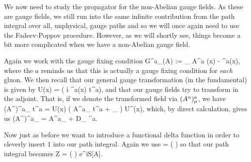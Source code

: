 We now need to study the propagator for the non-Abelian gauge fields. As these are gauge fields, we still run into the same infinite contribution from the path integral over all, unphysical, gauge paths and so we will once again need to use the Fadeev-Poppov procedure. However, as we will shortly see, things become a bit more complicated when we have a non-Abelian gauge field. 

Again we work with the gauge fixing condition 
\bse 
	G^a_{\omega}(A) := \p_{\mu} A^{a \mu}(x) - \omega^a(x),
\ese 
where the $a$ reminds us that this is actually a gauge fixing condition for \textit{each} gluon. We then recall that our general gauge transformation (in the fundamental) is given by 
\bse 
	U(x) = \exp\big( i \a^a(x) t^a\big),
\ese
and that our gauge fields try to transform in the adjoint. That is, if we denote the transformed field via $ (A^{\alpha})^a_{\mu} $, we have 
\bse 
	(A^{\a})^a_{\mu} t^a = U(x) \bigg( A^a_{\mu} t^a +  \p_{\mu} \bigg) U^{\dagger}(x),
\ese 
which, by direct calculation, gives us 
\bse 
	(A^{\a})^a_{\mu} = A^a_{\mu} + D_{\mu} \a^a.
\ese 

Now just as before we want to introduce a functional delta function in order to cleverly insert $1$ into our path integral. Again we use 
 = \int [\pD \a ] \del{} \det\bigg(  \bigg)
\ese 
so that our path integral becomes 
\bse 
	Z = \int [\pD A] [\pD \a] \del{} \det\bigg(  \bigg) e^{iS[A]}.
\ese 


